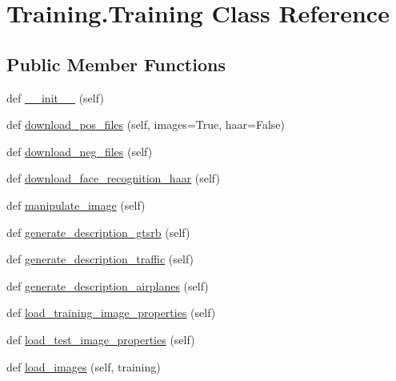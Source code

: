 \hypertarget{class_training_1_1_training}{}\section{Training.\+Training Class Reference}
\label{class_training_1_1_training}
\subsection*{Public Member Functions}
\begin{DoxyCompactItemize}
\item 
def \mbox{\hyperlink{class_training_1_1_training_aa5c3c606edf57118d04ce14e3bc5704d}{\+\_\+\+\_\+init\+\_\+\+\_\+}} (self)
\item 
def \mbox{\hyperlink{class_training_1_1_training_a097c544cd41a26efad6a1f43d9d3e79b}{download\+\_\+pos\+\_\+files}} (self, images=True, haar=False)
\item 
def \mbox{\hyperlink{class_training_1_1_training_a3b928a92d958223bfede214302c5df8b}{download\+\_\+neg\+\_\+files}} (self)
\item 
def \mbox{\hyperlink{class_training_1_1_training_af1e7984b798afa13b1a9624c9406ebf1}{download\+\_\+face\+\_\+recognition\+\_\+haar}} (self)
\item 
def \mbox{\hyperlink{class_training_1_1_training_a231b923ada43f82a67e09fc474b79ccf}{manipulate\+\_\+image}} (self)
\item 
def \mbox{\hyperlink{class_training_1_1_training_a28507bbd67dcd1161275a3d2b407b09a}{generate\+\_\+description\+\_\+gtsrb}} (self)
\item 
def \mbox{\hyperlink{class_training_1_1_training_a0efdb3216814d0cd34510d98eeae0440}{generate\+\_\+description\+\_\+traffic}} (self)
\item 
def \mbox{\hyperlink{class_training_1_1_training_a81056ed2095ad847bda80bf05a92ed7f}{generate\+\_\+description\+\_\+airplanes}} (self)
\item 
def \mbox{\hyperlink{class_training_1_1_training_a910d50cee577997808b934c6ef0d5a31}{load\+\_\+training\+\_\+image\+\_\+properties}} (self)
\item 
def \mbox{\hyperlink{class_training_1_1_training_aa886794bd150b7a8894db32437893757}{load\+\_\+test\+\_\+image\+\_\+properties}} (self)
\item 
def \mbox{\hyperlink{class_training_1_1_training_a6df4e220dd5cbd4769a84852fc4e9d60}{load\+\_\+images}} (self, training)
\end{DoxyCompactItemize}
